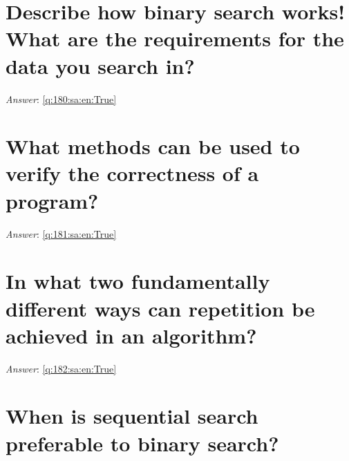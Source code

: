 \documentclass[a4paper,11pt,oneside]{book}
\begin{document}
\begin{sloppypar}
\section{Describe how binary search works! What are the requirements for the data you search in?}

\label{q:180:sa:en:False}

\vspace{2cm}

\noindent\makebox[\textwidth]{\hrulefill}

\vspace{1cm}

\textit{Answer}: \autoref{q:180:sa:en:True}



\section{What methods can be used to verify the correctness of a program?}

\label{q:181:sa:en:False}

\vspace{2cm}

\noindent\makebox[\textwidth]{\hrulefill}

\vspace{1cm}

\textit{Answer}: \autoref{q:181:sa:en:True}



\section{In what two fundamentally different ways can repetition be achieved in an algorithm?}

\label{q:182:sa:en:False}

\vspace{2cm}

\noindent\makebox[\textwidth]{\hrulefill}

\vspace{1cm}

\textit{Answer}: \autoref{q:182:sa:en:True}



\section{When is sequential search preferable to binary search?}

\label{q:183:sa:en:False}

\vspace{2cm}


\end{sloppypar}
\end{document}
